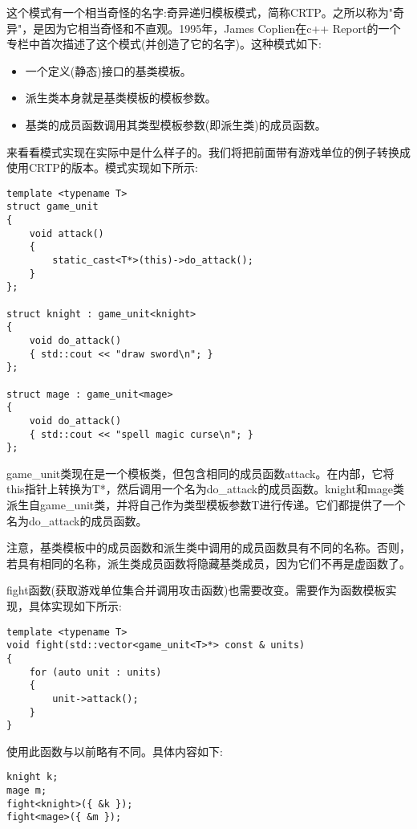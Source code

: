 
这个模式有一个相当奇怪的名字:奇异递归模板模式，简称CRTP。之所以称为"奇异"，是因为它相当奇怪和不直观。1995年，James Coplien在c++ Report的一个专栏中首次描述了这个模式(并创造了它的名字)。这种模式如下:

\begin{itemize}
\item
一个定义(静态)接口的基类模板。

\item
派生类本身就是基类模板的模板参数。

\item
基类的成员函数调用其类型模板参数(即派生类)的成员函数。
\end{itemize}

来看看模式实现在实际中是什么样子的。我们将把前面带有游戏单位的例子转换成使用CRTP的版本。模式实现如下所示:

\begin{lstlisting}[style=styleCXX]
template <typename T>
struct game_unit
{
	void attack()
	{
		static_cast<T*>(this)->do_attack();
	}
};

struct knight : game_unit<knight>
{
	void do_attack()
	{ std::cout << "draw sword\n"; }
};

struct mage : game_unit<mage>
{
	void do_attack()
	{ std::cout << "spell magic curse\n"; }
};
\end{lstlisting}

game\_unit类现在是一个模板类，但包含相同的成员函数attack。在内部，它将this指针上转换为T*，然后调用一个名为do\_attack的成员函数。knight和mage类派生自game\_unit类，并将自己作为类型模板参数T进行传递。它们都提供了一个名为do\_attack的成员函数。

注意，基类模板中的成员函数和派生类中调用的成员函数具有不同的名称。否则，若具有相同的名称，派生类成员函数将隐藏基类成员，因为它们不再是虚函数了。

fight函数(获取游戏单位集合并调用攻击函数)也需要改变。需要作为函数模板实现，具体实现如下所示:

\begin{lstlisting}[style=styleCXX]
template <typename T>
void fight(std::vector<game_unit<T>*> const & units)
{
	for (auto unit : units)
	{
		unit->attack();
	}
}
\end{lstlisting}

使用此函数与以前略有不同。具体内容如下:

\begin{lstlisting}[style=styleCXX]
knight k;
mage m;
fight<knight>({ &k });
fight<mage>({ &m });
\end{lstlisting}

